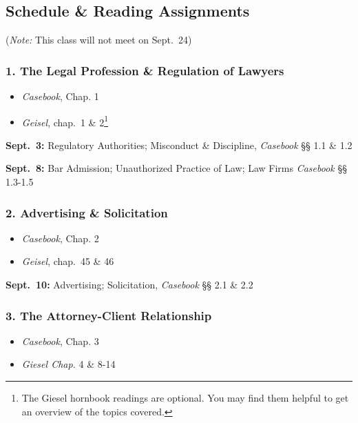 \documentclass[11pt,letterpaper,twoside]{article}
\providecommand{\tightlist}{%
\setlength{\itemsep}{0em}\setlength{\parskip}{0em}\setlength{\itemindent}{0em}}
\begin{document}
\subsection{Schedule \& Reading
Assignments}\label{schedule-reading-assignments}

(\emph{Note:} This class will not meet on Sept.~24)

\subsubsection{1. The Legal Profession \& Regulation of
Lawyers}\label{the-legal-profession-regulation-of-lawyers}

\begin{itemize}
\tightlist
\item
  \emph{Casebook}, Chap. 1
\item
  \emph{Geisel}, chap.~1 \& 2\footnote{The Giesel hornbook readings are
    optional. You may find them helpful to get an overview of the topics
    covered.}
\end{itemize}

\textbf{Sept.~3:} Regulatory Authorities; Misconduct \& Discipline,
\emph{Casebook} §§ 1.1 \& 1.2

\textbf{Sept.~8:} Bar Admission; Unauthorized Practice of Law; Law Firms
\emph{Casebook} §§ 1.3-1.5

\subsubsection{2. Advertising \&
Solicitation}\label{advertising-solicitation}

\begin{itemize}
\tightlist
\item
  \emph{Casebook}, Chap. 2
\item
  \emph{Geisel}, chap.~45 \& 46
\end{itemize}

\textbf{Sept.~10:} Advertising; Solicitation, \emph{Casebook} §§ 2.1 \&
2.2

\subsubsection{3. The Attorney-Client
Relationship}\label{the-attorney-client-relationship}

\begin{itemize}
\tightlist
\item
  \emph{Casebook}, Chap. 3
\item
  \emph{Giesel Chap.} 4 \& 8-14
\end{itemize}
\end{document}
